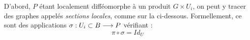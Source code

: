 D'abord, $P$ étant localement difféomorphe à un produit $G\times U_i$, on peut y tracer des graphes appelés \emph{sections locales}, comme sur la  ci-dessous. Formellement, ce sont des applications $\sigma : U_i\subset B\longrightarrow P$ vérifiant :
\[\pi\circ \sigma = Id_{{\displaystyle U}}\]
\\
\begin{figure}[t]
	\begin{floatrow}
		
	\end{floatrow}
\end{figure}

